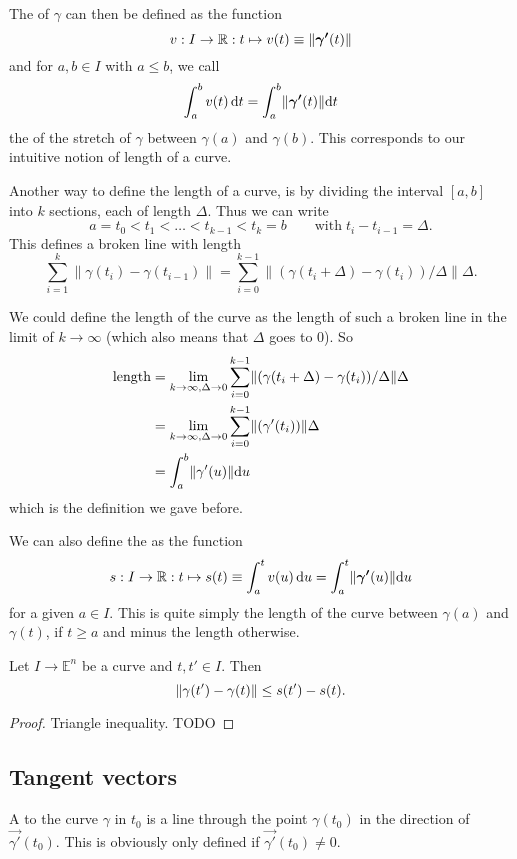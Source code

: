 The  of $\gamma$ can then be defined as the function
\[ v: I \to \mathbb{R}: t \mapsto v(t) \equiv \lVert\boldsymbol{\mathrm{\gamma'}}(t)\lVert \]
and for $a,b \in I$ with $a\leq b$, we call
\[ \int^b_a v(t) \operatorname{d \!}{t} = \int^b_a \lVert \boldsymbol{\mathrm{\gamma'}}(t) \lVert \operatorname{d \!}{t} \]
the  of the stretch of $\gamma$ between $\gamma(a)$ and $\gamma(b)$. This corresponds to our intuitive notion of length of a curve.

\begin{note}
Another way to define the length of a curve, is by dividing the interval $[a,b]$ into $k$ sections, each of length $\Delta$. Thus we can write
\[ a = t_0 < t_1 < \ldots < t_{k-1} < t_k = b \qquad \text{with} \; t_i - t_{i-1} = \Delta. \]
This defines a broken line with length
\[ \sum^k_{i=1} \lVert \gamma(t_i) - \gamma(t_{i-1})\lVert  = \sum^{k-1}_{i=0} \lVert (\gamma(t_i+ \Delta) - \gamma(t_{i})) / \Delta \lVert \Delta. \]

We could define the length of the curve as the length of such a broken line in the limit of $k \to \infty$ (which also means that $\Delta$ goes to $0$). So
\begin{align*}
\text{length} &= \lim_{k\to\infty, \Delta\to 0} \sum^{k-1}_{i=0} \lVert (\gamma(t_i+ \Delta) - \gamma(t_{i})) / \Delta \lVert \Delta \\
&= \lim_{k\to\infty, \Delta\to 0}\sum^{k-1}_{i=0} \lVert (\gamma'(t_i)) \lVert \Delta \\
&= \int^b_a \lVert \gamma'(u) \lVert \operatorname{d \!}{u}
\end{align*}
which is the definition we gave before.
\end{note}

We can also define the  as the function
\[ s: I \to \mathbb{R}: t\mapsto s(t) \equiv \int_a^t v(u) \operatorname{d \!}{u} = \int_a^t \lVert \boldsymbol{\mathrm{\gamma'}}(u)\lVert \operatorname{d \!}{u} \]
for a given $a\in I$. This is quite simply the length of the curve between $\gamma(a)$ and $\gamma(t)$, if $t\geq a$ and minus the length otherwise.

\begin{lemma} \label{convexityArcLength}
Let $I\to \mathbb{E}^n$ be a curve and $t,t'\in I$. Then
\[ \lVert\gamma(t')-\gamma(t)\rVert \leq s(t') - s(t). \]
\end{lemma}
\begin{proof}
Triangle inequality. TODO
\end{proof}

\subsection{Tangent vectors}
A  to the curve $\gamma$ in $t_0$ is a line through the point $\gamma(t_0)$ in the direction of $\vec{\gamma'}(t_0)$. This is obviously only defined if $\vec{\gamma'}(t_0) \neq 0$.

